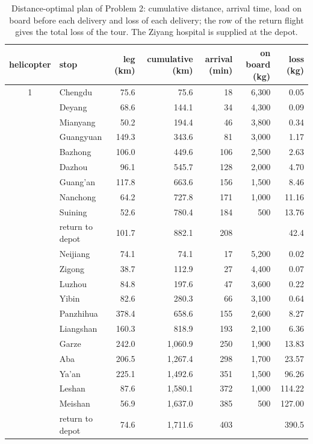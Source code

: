 \documentclass[11pt,a4paper]{article}
\theoremstyle{definition}
\begin{document}
\begin{table}[H]
\centering
\caption{Distance-optimal plan of Problem 2: cumulative distance, arrival time, load on board before each delivery and loss of each delivery; the row of the return flight gives the total loss of the tour. The Ziyang hospital is supplied at the depot.}\label{tab:route-detail}
\small\setlength{\tabcolsep}{5pt}
\begin{tabular}{clrrrrr}
\toprule
helicopter & stop & leg (km) & cumulative (km) & arrival (min) & on board (kg) & loss (kg) \\
\midrule
1 & Chengdu & 75.6 & 75.6 & 18 & 6{,}300 & 0.05 \\
 & Deyang & 68.6 & 144.1 & 34 & 4{,}300 & 0.09 \\
 & Mianyang & 50.2 & 194.4 & 46 & 3{,}800 & 0.34 \\
 & Guangyuan & 149.3 & 343.6 & 81 & 3{,}000 & 1.17 \\
 & Bazhong & 106.0 & 449.6 & 106 & 2{,}500 & 2.63 \\
 & Dazhou & 96.1 & 545.7 & 128 & 2{,}000 & 4.70 \\
 & Guang'an & 117.8 & 663.6 & 156 & 1{,}500 & 8.46 \\
 & Nanchong & 64.2 & 727.8 & 171 & 1{,}000 & 11.16 \\
 & Suining & 52.6 & 780.4 & 184 & 500 & 13.76 \\
 & return to depot & 101.7 & 882.1 & 208 & & 42.4 \\
\addlinespace
2 & Neijiang & 74.1 & 74.1 & 17 & 5{,}200 & 0.02 \\
 & Zigong & 38.7 & 112.9 & 27 & 4{,}400 & 0.07 \\
 & Luzhou & 84.8 & 197.6 & 47 & 3{,}600 & 0.22 \\
 & Yibin & 82.6 & 280.3 & 66 & 3{,}100 & 0.64 \\
 & Panzhihua & 378.4 & 658.6 & 155 & 2{,}600 & 8.27 \\
 & Liangshan & 160.3 & 818.9 & 193 & 2{,}100 & 6.36 \\
 & Garze & 242.0 & 1{,}060.9 & 250 & 1{,}900 & 13.83 \\
 & Aba & 206.5 & 1{,}267.4 & 298 & 1{,}700 & 23.57 \\
 & Ya'an & 225.1 & 1{,}492.6 & 351 & 1{,}500 & 96.26 \\
 & Leshan & 87.6 & 1{,}580.1 & 372 & 1{,}000 & 114.22 \\
 & Meishan & 56.9 & 1{,}637.0 & 385 & 500 & 127.00 \\
 & return to depot & 74.6 & 1{,}711.6 & 403 & & 390.5 \\
\bottomrule
\end{tabular}
\end{table}
\end{document}
